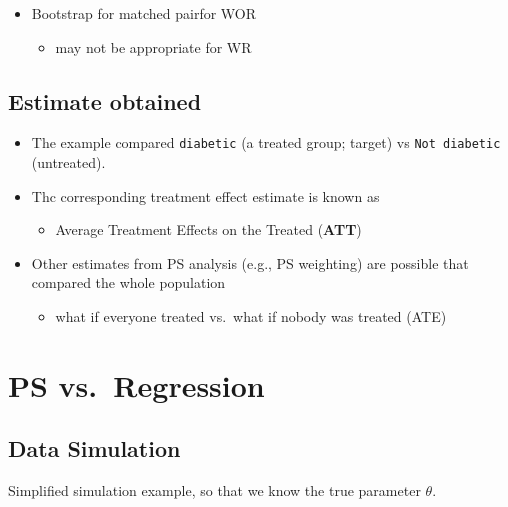\documentclass[
]{book}
\providecommand{\tightlist}{%
  \setlength{\itemsep}{0pt}\setlength{\parskip}{0pt}}
\begin{document}
\begin{itemize}
\tightlist
\item
  Bootstrap for matched pairfor WOR \citep{austin2014use}

  \begin{itemize}
  \tightlist
  \item
    may not be appropriate for WR
  \end{itemize}
\end{itemize}

\hypertarget{estimate-obtained}{%
\section{Estimate obtained}\label{estimate-obtained}}

\begin{itemize}
\tightlist
\item
  The example compared \texttt{diabetic} (a treated group; target) vs \texttt{Not\ diabetic} (untreated).
\item
  Thc corresponding treatment effect estimate is known as

  \begin{itemize}
  \tightlist
  \item
    Average Treatment Effects on the Treated (\textbf{ATT})
  \end{itemize}
\item
  Other estimates from PS analysis (e.g., PS weighting) are possible that compared the whole population

  \begin{itemize}
  \tightlist
  \item
    what if everyone treated vs.~what if nobody was treated (ATE)
  \end{itemize}
\end{itemize}

\hypertarget{compare}{%
\chapter{PS vs.~Regression}\label{compare}}

\hypertarget{data-simulation}{%
\section{Data Simulation}\label{data-simulation}}

Simplified simulation example, so that we know the true parameter \(\theta\).
\end{document}
